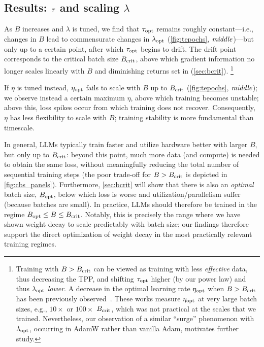 \subsection{Results: $\tau$ and scaling $\lambda$}\label{sec:tema_results}




As $B$ increases and $\lambda$ is tuned, we find that ${\tau}_{\text{opt}}$
remains roughly constant---i.e., changes in $B$ lead to commensurate
changes in $\lambda_{\text{opt}}$ (\cref{fig:tepochs}, $\text{\emph{middle}}$)---but only
up to a certain point, after which ${\tau}_{\text{opt}}$ begins to drift. The
drift point corresponds to the critical batch size $B_{\text{crit}}$, above
which gradient information no longer scales linearly with $B$ and
diminishing returns set in (\cref{sec:bcrit}).%
\footnote{Training with $B > B_{\text{crit}}$ can be viewed as training with less
\emph{effective} data, thus decreasing the TPP, and shifting
${\tau}_{\text{opt}}$ higher (by our power law) and thus $\lambda_{\text{opt}}$
\emph{lower}.
%
A decrease in the optimal learning rate $\eta_{\text{opt}}$ when $B > B_{\text{crit}}$ has
been previously observed~\citep{li2024surge,filatov2024time}.  These
works measure $\eta_{\text{opt}}$ at very large batch sizes, e.g., $10\times$ or
$100\times$ $B_{\text{crit}}$, which was not practical at the scales that we
trained.  Nevertheless, our observation of a similar ``surge''
phenomenon with $\lambda_{\text{opt}}$, occurring in AdamW rather than vanilla
Adam, motivates further study.}

If $\eta$ is tuned instead, $\eta_{\text{opt}}$ fails to scale with $B$ up to
$B_{\text{crit}}$ (\cref{fig:tepochs}, $\text{\emph{middle}}$); we observe instead a
certain maximum $\eta$, above which training becomes unstable; above
this, loss spikes occur from which training does not recover.
Consequently, $\eta$ has less flexibility to scale with $B$; training
stability is more fundamental than timescale.

In general, LLMs typically train faster and utilize hardware better
with larger $B$, but only up to $B_{\text{crit}}$: beyond this point, much more
data (and compute) is needed to obtain the same loss, without
meaningfully reducing the total number of sequential training steps
(the poor trade-off for $B > B_{\text{crit}}$ is depicted in
\cref{fig:cbs_panels}). Furthermore, \cref{sec:bcrit} will show that
there is also an \emph{optimal} batch size, $B_{\text{opt}}$, below which loss
is worse and utilization/parallelism suffer (because batches are
small). In practice, LLMs should therefore be trained in the regime
$B_{\text{opt}} \le B \le B_{\text{crit}}$. Notably, this is precisely the range where
we have shown weight decay to scale predictably with batch size; our
findings therefore support the direct optimization of weight decay in
the most practically relevant training regimes.


